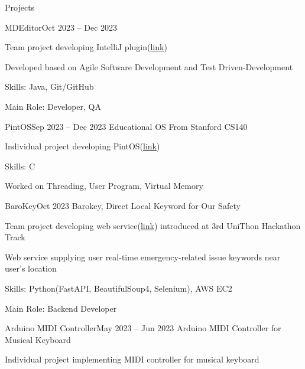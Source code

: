 \documentclass{resume}
\begin{document}
\begin{rSection}{Projects}
\begin{rSubsection}{MDEditor}{Oct 2023 -- Dec 2023}
        \item Team project developing IntelliJ plugin(\href{https://github.com/minsusun/csed332-project}{link})

        \item Developed based on Agile Software Development and Test Driven-Development

        \item Skills: Java, Git/GitHub

        \item Main Role: Developer, QA
    \end{rSubsection}

    \begin{rSubsection}{PintOS}{Sep 2023 -- Dec 2023}
        Educational OS From Stanford CS140

        \item Individual project developing PintOS(\href{https://github.com/minsusun/csed312-pintos}{link})

        \item Skills: C

        \item Worked on Threading, User Program, Virtual Memory
    \end{rSubsection}

    \begin{rSubsection}{BaroKey}{Oct 2023}
        Barokey, Direct Local Keyword for Our Safety

        \item Team project developing web service(\href{https://github.com/UniD3-Hackathon-Team4/barokey}{link}) introduced at 3rd UniThon Hackathon Track

        \item Web service supplying user real-time emergency-related issue keywords near user's location

        \item Skills: Python(FastAPI, BeautifulSoup4, Selenium), AWS EC2

        \item Main Role: Backend Developer
    \end{rSubsection}

    \begin{rSubsection}{Arduino MIDI Controller}{May 2023 -- Jun 2023}
        Arduino MIDI Controller for Musical Keyboard

        \item Individual project implementing MIDI controller for musical keyboard


\end{rSubsection}
\end{rSection}
\end{document}
